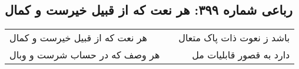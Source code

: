 \begin{center}
\section*{رباعی شماره ۳۹۹: هر نعت که از قبیل خیرست و کمال}
\label{sec:sh399}
\begin{longtable}{l p{0.5cm} r}
هر نعت که از قبیل خیرست و کمال
&&
باشد ز نعوت ذات پاک متعال
\\
هر وصف که در حساب شرست و وبال
&&
دارد به قصور قابلیات مل
\\
\end{longtable}
\end{center}
